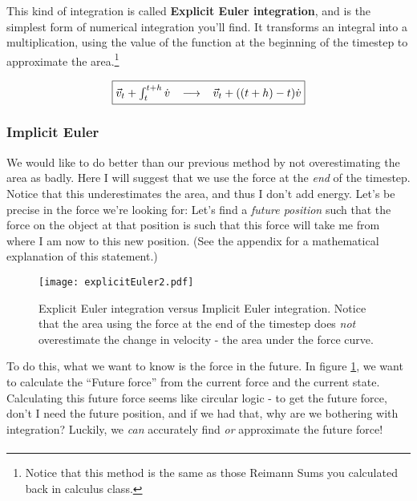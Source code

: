 \documentclass[]{article}
\begin{document}
This kind of integration is called \textbf{Explicit Euler integration}, and is the simplest form of numerical integration you'll find. It transforms an integral into a multiplication, using the value of the function at the beginning of the timestep to approximate the area.\footnote{Notice that this method is the same as those Reimann Sums you calculated back in calculus class.}

\begin{equation}
	\fbox{$
	\vec{v}_t + \int_t^{t+h}\dot{v} \;\;\; \longrightarrow \;\;\; \vec{v}_t + ((t+h) - t)\dot{v}
	$}
\end{equation}

\pagebreak
\subsubsection{Implicit Euler}

We would like to do better than our previous method by not overestimating the area as badly. Here I will suggest that we use the force at the \emph{end} of the timestep. Notice that this underestimates the area, and thus I don't add energy. Let's be precise in the force we're looking for: Let's find a \emph{future position} such that the force on the object at that position is such that this force will take me from where I am now to this new position. (See the appendix for a mathematical explanation of this statement.)

\begin{figure}[htp]
    \centering
    \texttt{[image: explicitEuler2.pdf]}
    \caption{Explicit Euler integration versus Implicit Euler integration. Notice that the area using the force at the end of the timestep does \emph{not} overestimate the change in velocity - the area under the force curve.}
	\label{explicitimplicitEuler}
\end{figure}

To do this, what we want to know is the force in the future. In figure \ref{explicitimplicitEuler}, we want to calculate the ``Future force'' from the current force and the current state. Calculating this future force seems like circular logic - to get the future force, don't I need the future position, and if we had that, why are we bothering with integration? Luckily, we \emph{can} accurately find \emph{or} approximate the future force! 

\paragraph{}
\end{document}
